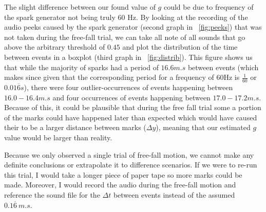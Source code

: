 \documentclass[11pt]{article}
\begin{document}
\begin{multicols}{2}
\bigskip

\noindent The slight difference between our found value of $g$ could be due to frequency of the spark generator not being truly $60$ Hz. By looking at the recording of the audio peeks caused by the spark generator (second graph in ~\autoref{fig:peeks}) that was not taken during the free-fall trial, we can take all note of all sounds that go above the arbitrary threshold of $0.45$ and plot the distribution of the time between events in a boxplot (third graph in ~\autoref{fig:distrib}). This figure shows us that while the majority of sparks had a period of $16.6 \si{m.s}$ between events (which makes since given that the  corresponding period for a frequency of 60Hz is $\frac{1}{60}$ or $0.01\overline{6} \si{s}$), there were four outlier-occurrences of events happening between $16.0-16.4 \si{m.s}$ and four occurrences of events happening between $17.0-17.2 \si{m.s}$. Because of this, it could be plausible that during the free fall trial some a portion of the marks could have happened later than expected which would have caused their to be a larger distance between marks ($\Delta y$), meaning that our estimated $g$ value would be larger than reality.

\bigskip

\noindent Because we only observed a single trial of free-fall motion, we cannot make any definite conclusions or extrapolate it to difference scenarios. If we were to re-run this trial, I would take a longer piece of paper tape so more marks could be made. Moreover, I would record the audio during the free-fall motion and reference the sound file for the $\Delta t$ between events instead of the assumed $0.1\overline{6}\ \si{m.s}$.




\end{multicols}




\end{document}
